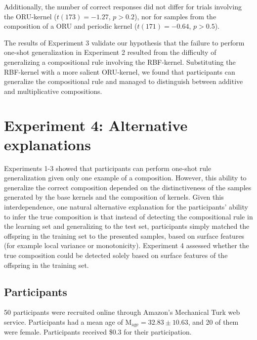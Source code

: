 \documentclass[10pt,letterpaper]{article}
\begin{document}
Additionally, the number of correct responses did not differ for trials involving the ORU-kernel ($t(173)=-1.27$, $p>0.2$), nor for samples from the composition of a ORU and periodic kernel ($t(171)=-0.64$, $p>0.5$).


The results of Experiment 3 validate our hypothesis that the failure to perform one-shot generalization in Experiment 2 resulted from the difficulty of generalizing a compositional rule involving the RBF-kernel. Substituting the RBF-kernel with a more salient ORU-kernel, we found that participants can generalize the compositional rule and managed to distinguish between additive and multiplicative compositions. 

\section{Experiment 4: Alternative explanations}

Experiments 1-3 showed that participants can perform one-shot rule generalization given only one example of a composition. However, this ability to generalize the correct composition depended on the distinctiveness of the samples generated by the base kernels and the composition of kernels. 
Given this interdependence, one natural alternative explanation for the participants' ability to infer the true composition is that instead of detecting the compositional rule in the learning set and generalizing to the test set, participants simply matched the offspring in the training set to the presented samples, based on surface features (for example local variance or monotonicity).
Experiment 4 assessed whether the true composition could be detected solely based on surface features of the offspring in the training set.


\subsection{Participants} 
50 participants were recruited online through Amazon's Mechanical Turk web service. Participants had a mean age of M$_\text{age}=32.83 \pm 10.63$, and 20 of them were female. Participants received \$0.3 for their participation. 
\end{document}
